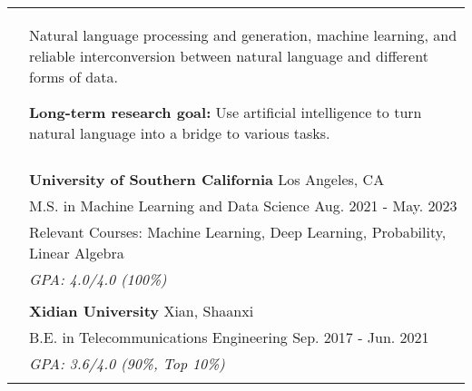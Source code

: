 \documentclass[letterpaper, 10pt]{article}
\begin{document}
\begin{longtable}{p{1.3in}p{4.8in}}



\nohyphens{\color{black}{Research Interests}}
& Natural language processing and generation, machine learning, and reliable interconversion between natural language and different forms of data.

\textbf{Long-term research goal:} Use artificial intelligence to turn natural language into a bridge to various tasks. \\

\\




\color{black}{Education} & \textbf{University of Southern California} \hfill Los Angeles, CA \\
& M.S. in Machine Learning and Data Science \hfill Aug. 2021 - May. 2023\\
& Relevant Courses: Machine Learning, Deep Learning, Probability, Linear Algebra \\
& {\it GPA: 4.0/4.0 (100\%)}\\
& \\

& \textbf{Xidian University} \hfill Xian, Shaanxi\\
& B.E. in Telecommunications Engineering \hfill Sep. 2017 - Jun. 2021 \\
& {\it GPA: 3.6/4.0 (90\%, Top 10\%)}\\
& \\



\end{longtable}
\end{document}
